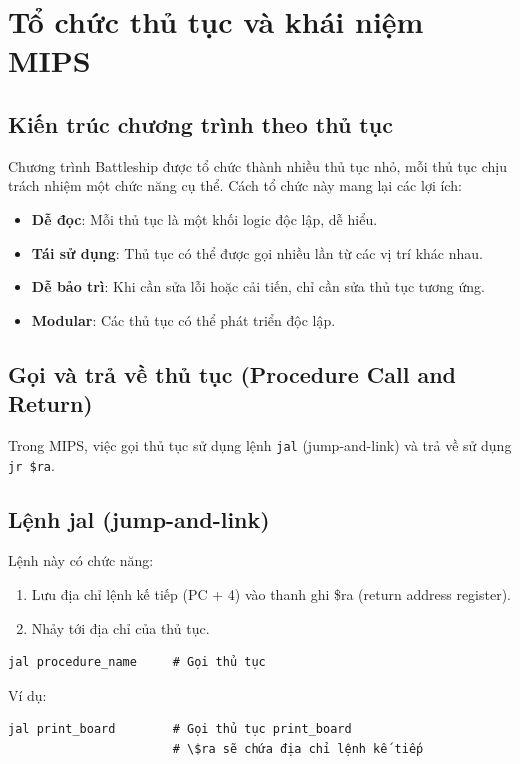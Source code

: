 
\section{Tổ chức thủ tục và khái niệm MIPS}

\subsection{Kiến trúc chương trình theo thủ tục}

Chương trình Battleship được tổ chức thành nhiều thủ tục nhỏ, mỗi thủ tục chịu trách nhiệm một chức năng cụ thể. Cách tổ chức này mang lại các lợi ích:

\begin{itemize}
    \item \textbf{Dễ đọc}: Mỗi thủ tục là một khối logic độc lập, dễ hiểu.
    \item \textbf{Tái sử dụng}: Thủ tục có thể được gọi nhiều lần từ các vị trí khác nhau.
    \item \textbf{Dễ bảo trì}: Khi cần sửa lỗi hoặc cải tiến, chỉ cần sửa thủ tục tương ứng.
    \item \textbf{Modular}: Các thủ tục có thể phát triển độc lập.
\end{itemize}

\subsection{Gọi và trả về thủ tục (Procedure Call and Return)}

Trong MIPS, việc gọi thủ tục sử dụng lệnh \texttt{jal} (jump-and-link) và trả về sử dụng \texttt{jr \$ra}.

\subsection{Lệnh jal (jump-and-link)}

Lệnh này có chức năng:
\begin{enumerate}
    \item Lưu địa chỉ lệnh kế tiếp (PC + 4) vào thanh ghi \$ra (return address register).
    \item Nhảy tới địa chỉ của thủ tục.
\end{enumerate}

\begin{verbatim}
jal procedure_name     # Gọi thủ tục
\end{verbatim}

Ví dụ:
\begin{verbatim}
jal print_board        # Gọi thủ tục print_board
                       # \$ra sẽ chứa địa chỉ lệnh kế tiếp
\end{verbatim}

